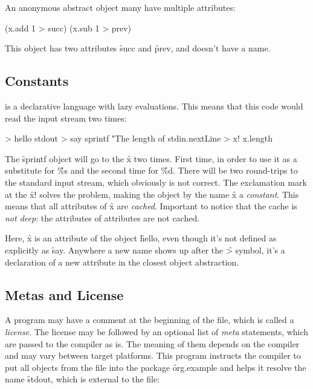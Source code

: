An anonymous abstract object many have multiple attributes:

\begin{eocode}
[x] (x.add 1 > succ) (x.sub 1 > prev)
\end{eocode}

This object has two attributes \f{succ} and \f{prev}, and doesn't
have a name.

\subsection{Constants}

\eo{} is a declarative language with lazy evaluations. This means
that this code would read the input stream two times:

\begin{eocode}
[] > hello
  stdout > say
    sprintf
      "The length of %
      stdin.nextLine > x!
      x.length
\end{eocode}

The \f{sprintf} object will go to the \f{x} two times. First time,
in order to use it as a substitute for \f{\%s} and the second time for
\f{\%d}. There will be two round-trips to the standard input stream, which
obviously is not correct. The exclamation mark at the \f{x!} solves the
problem, making the object by the name \f{x} a \emph{constant}. This means
that all attributes of \f{x} are \emph{cached}. Important to notice
that the cache is \emph{not deep}: the attributes of attributes are not cached.

Here, \f{x} is an attribute of the object \f{hello}, even though
it's not defined as explicitly as \f{say}. Anywhere a new
name shows up after the \f{>} symbol, it's a declaration of a new
attribute in the closest object abstraction.

\subsection{Metas and License}

A program may have a comment at the beginning of the file, which
is called a \emph{license}. The license may be followed by an optional
list of \emph{meta} statements, which are passed to the compiler
as is. The meaning of them depends on the compiler and may vary
between target platforms. This program instructs the compiler
to put all objects from the file into the package \f{org.example}
and helps it resolve the name \f{stdout}, which is external
to the file:

